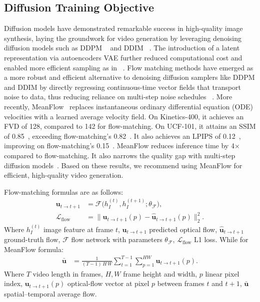 \subsection{Diffusion Training Objective} %
Diffusion models have demonstrated remarkable success in high-quality image synthesis, laying the groundwork for video generation by leveraging denoising diffusion models such as DDPM ~\cite{ddpm2020} and DDIM ~\cite{ddim2020}. The introduction of a latent representation via autoencoders VAE further reduced computational cost and enabled more efficient sampling as in ~\cite{ldm2022}. Flow matching methods have emerged as a more robust and efficient alternative to denoising diffusion samplers like DDPM and DDIM by directly regressing continuous-time vector fields that transport noise to data, thus reducing reliance on multi-step noise schedules ~\cite{flowmatching2023, flowmatching2024}. More recently, MeanFlow~\cite{geng2025meanflows} replaces instantaneous ordinary differential equation (ODE) velocities with a learned average velocity field. On Kinetics-400, it achieves an FVD of 128, compared to 142 for flow-matching. On UCF-101, it attains an SSIM of 0.85~\cite{wang2004image}, exceeding flow-matching’s 0.82~\cite{davtyan2023river}. It also achieves an LPIPS of 0.12~\cite{zhang2018unreasonable}, improving on flow-matching’s 0.15~\cite{flowmatching2023, flowmatching2024}. MeanFlow reduces inference time by 4× compared to flow-matching. It also narrows the quality gap with multi-step diffusion models~\cite{wang2025diffuse}. Based on these results, we recommend using MeanFlow for efficient, high-quality video generation.


Flow-matching formulas are as follows:
\begin{align}
\mathbf{u}_{t\!\rightarrow\!t+1} &= 
\mathcal{F}\!\bigl(h_I^{(t)},h_I^{(t+1)};\theta_{\mathcal{F}}\bigr), \\
\mathcal{L}_{\text{flow}} &=
\bigl\lVert\mathbf{u}_{t\!\rightarrow\!t+1}(p)-\hat{\mathbf{u}}_{t\!\rightarrow\!t+1}(p)\bigr\rVert_{2}^{2}.
\end{align}
Where $h_I^{(t)}$ image feature at frame $t$, $\mathbf{u}_{t\to t+1}$ predicted optical flow, $\hat{\mathbf{u}}_{t\to t+1}$ ground-truth flow, $\mathcal{F}$ flow network with parameters $\theta_{\mathcal{F}}$, $\mathcal{L}_{\text{flow}}$ L1 loss. While for MeanFlow formula:
\begin{align}
\bar{\mathbf{u}} &=
\frac{1}{(T-1)\,H\,W}\sum_{t=1}^{T-1}\sum_{p=1}^{HW}
\mathbf{u}_{t\!\rightarrow\!t+1}(p).
\end{align}
Where $T$ video length in frames, $H,W$ frame height and width, $p$ linear pixel index, $\mathbf{u}_{t\to t+1}(p)$ optical-flow vector at pixel $p$ between frames $t$ and $t\!+\!1$, $\bar{\mathbf{u}}$ spatial–temporal average flow. 

